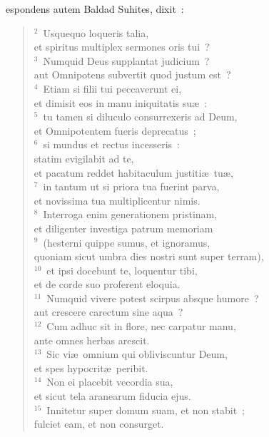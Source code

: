 \bchapter
{}espondens autem Baldad Suhites, dixit~:
\begin{flushleft}\begin{verse}\vspace{6pt}${}^{2}$~Usquequo loqueris talia,\\ et spiritus multiplex sermones oris tui~?\\
${}^{3}$~Numquid Deus supplantat judicium~?\\ aut Omnipotens subvertit quod justum est~?\\
${}^{4}$~Etiam si filii tui peccaverunt ei,\\ et dimisit eos in manu iniquitatis su\ae~:\\
${}^{5}$~tu tamen si diluculo consurrexeris ad Deum,\\ et Omnipotentem fueris deprecatus~;\\
${}^{6}$~si mundus et rectus incesseris~:\\ statim evigilabit ad te,\\ et pacatum reddet habitaculum justiti\ae\ tu\ae ,\\
${}^{7}$~in tantum ut si priora tua fuerint parva,\\ et novissima tua multiplicentur nimis.\\
${}^{8}$~Interroga enim generationem pristinam,\\ et diligenter investiga patrum memoriam\\
${}^{9}$~(hesterni quippe sumus, et ignoramus,\\ quoniam sicut umbra dies nostri sunt super terram),\\
${}^{10}$~et ipsi docebunt te, loquentur tibi,\\ et de corde suo proferent eloquia.\\
${}^{11}$~Numquid vivere potest scirpus absque humore~?\\ aut crescere carectum sine aqua~?\\
${}^{12}$~Cum adhuc sit in flore, nec carpatur manu,\\ ante omnes herbas arescit.\\
${}^{13}$~Sic vi\ae\ omnium qui obliviscuntur Deum,\\ et spes hypocrit\ae\ peribit.\\
${}^{14}$~Non ei placebit vecordia sua,\\ et sicut tela aranearum fiducia ejus.\\
${}^{15}$~Innitetur super domum suam, et non stabit~;\\ fulciet eam, et non consurget.\\

\end{verse}
\end{flushleft}
